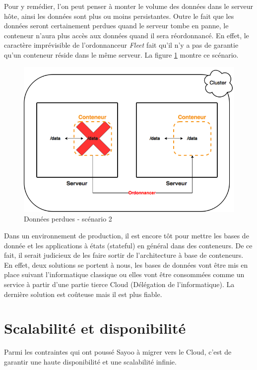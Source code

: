 \begin{onehalfspace}
Pour y remédier, l'on peut penser à monter le volume des données dans le serveur hôte, ainsi les données sont plus ou moins persistantes. Outre le fait que les données seront certainement perdues quand le serveur tombe en panne, le conteneur n'aura plus accès aux données quand il sera réordonnancé. En effet, le caractère imprévisible de l'ordonnanceur \emph{Fleet} fait qu'il n'y a pas de garantie qu'un conteneur réside dans le même serveur. La figure \ref{fig:database2} montre ce scénario.

\begin{figure}[H]
\centering
\includegraphics [scale=0.5]{chapitre4/assets/database2}
\caption{Données perdues - scénario 2}
\label{fig:database2}
\end{figure}


Dans un environnement de production, il est encore tôt pour mettre les bases de donnée et les applications à états (stateful) en général dans des conteneurs. De ce fait, il serait judicieux de les faire sortir de l'architecture à base de conteneurs. En effet, deux solutions se portent à nous, les bases de données vont être mis en place suivant l'informatique classique ou elles vont être consommées comme un service à partir d'une partie tierce Cloud (Délégation de l'informatique). La dernière solution est coûteuse mais il est plus fiable.



\section{Scalabilité et disponibilité}


Parmi les contraintes qui ont poussé Sayoo à migrer vers le Cloud, c'est de garantir une haute disponibilité et une scalabilité infinie.


\end{onehalfspace}
